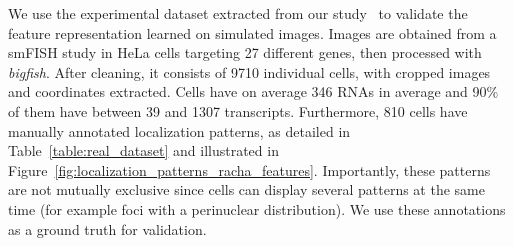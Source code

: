 We use the experimental dataset extracted from our study~\cite{CHOUAIB_2020} to validate the feature representation learned on simulated images.
Images are obtained from a \ac{smFISH} study in HeLa cells targeting 27 different genes, then processed with \emph{bigfish}.
After cleaning, it consists of 9710 individual cells, with cropped images and coordinates extracted.
Cells have on average 346 \ac{RNA}s in average and 90\% of them have between 39 and 1307 transcripts.
Furthermore, 810 cells have manually annotated localization patterns, as detailed in Table~\ref{table:real_dataset} and illustrated in Figure~\ref{fig:localization_patterns_racha_features}.
Importantly, these patterns are not mutually exclusive since cells can display several patterns at the same time (for example foci with a perinuclear distribution).
We use these annotations as a ground truth for validation.

